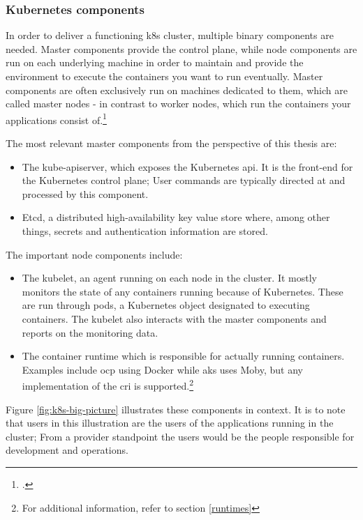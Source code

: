\subsubsection{Kubernetes components} \label{k8sComponents}

In order to deliver a functioning \gls{k8s} cluster, multiple binary components are needed.
Master components provide the control plane, while node components are run on each underlying machine in order to maintain and provide the environment to execute the containers you want to run eventually.
Master components are often exclusively run on machines dedicated to them, which are called master nodes - in contrast to worker nodes, which run the containers your applications consist of.\footcite[][, section 'Master Components']{k8sComponents}

The most relevant master components from the perspective of this thesis are:
\begin{itemize}

\item The kube-apiserver, which exposes the Kubernetes \gls{api}. It is the front-end for the Kubernetes control plane; User commands are typically directed at and processed by this component.

\item Etcd, a distributed high-availability key value store where, among other things, secrets and authentication information are stored.

\end{itemize}

The important node components include:
\begin{itemize}

\item The kubelet, an agent running on each node in the cluster. It mostly monitors the state of any containers running because of Kubernetes. These are run through pods, a Kubernetes object designated to executing containers. The kubelet also interacts with the master components and reports on the monitoring data.

\item The container runtime which is responsible for actually running containers. Examples include \gls{ocp} using Docker while \gls{aks} uses Moby, but any implementation of the \gls{cri} is supported.\footnote{For additional information, refer to section \ref{runtimes}} 

\end{itemize}

Figure \ref{fig:k8s-big-picture} illustrates these components in context. It is to note that users in this illustration are the users of the applications running in the cluster; From a provider standpoint the users would be the people responsible for development and operations.

